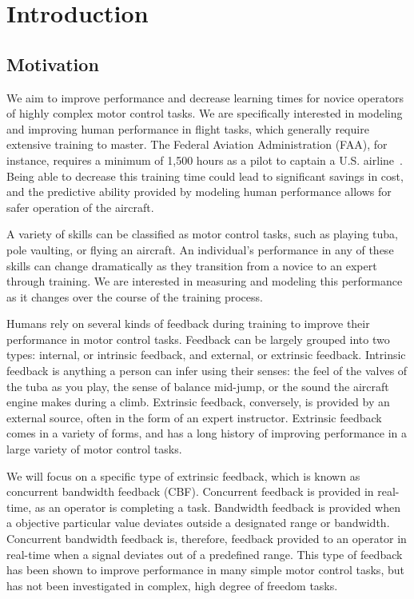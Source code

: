 \chapter{Introduction}

\section{Motivation}
\label{sec:intro_overview}
We aim to improve performance and decrease learning times for novice operators of highly complex motor control tasks.
We are specifically interested in modeling and improving human performance in flight tasks, which generally require extensive training to master.
The Federal Aviation Administration (FAA), for instance, requires a minimum of 1,500 hours as a pilot to captain a U.S. airline~\citep{FAA}.
Being able to decrease this training time could lead to significant savings in cost, and the predictive ability provided by modeling human performance allows for safer operation of the aircraft.

A variety of skills can be classified as motor control tasks, such as playing tuba, pole vaulting, or flying an aircraft.
An individual's performance in any of these skills can change dramatically as they transition from a novice to an expert through training.
We are interested in measuring and modeling this performance as it changes over the course of the training process.

Humans rely on several kinds of feedback during training to improve their performance in motor control tasks.
Feedback can be largely grouped into two types: internal, or intrinsic feedback, and external, or extrinsic feedback.
Intrinsic feedback is anything a person can infer using their senses: the feel of the valves of the tuba as you play, the sense of balance mid-jump, or the sound the aircraft engine makes during a climb.
Extrinsic feedback, conversely, is provided by an external source, often in the form of an expert instructor.
Extrinsic feedback comes in a variety of forms, and has a long history of improving performance in a large variety of motor control tasks.

We will focus on a specific type of extrinsic feedback, which is known as concurrent bandwidth feedback (CBF).
Concurrent feedback is provided in real-time, as an operator is completing a task.
Bandwidth feedback is provided when a objective particular value deviates outside a designated range or bandwidth.
Concurrent bandwidth feedback is, therefore, feedback provided to an operator in real-time when a signal deviates out of a predefined range.
This type of feedback has been shown to improve performance in many simple motor control tasks, but has not been investigated in complex, high degree of freedom tasks.

